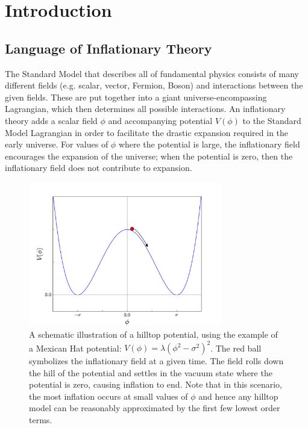 \documentclass[a4paper,11pt]{article}
\begin{document}
\newpage
{}
\small %

\section{Introduction}
\subsection{Language of Inflationary Theory}
\label{sec:GeneralDescription}
The Standard Model that describes all of fundamental physics consists of many different fields (e.g. scalar, vector, Fermion, Boson) and interactions between the given fields. These are put together into a giant universe-encompassing Lagrangian, which then determines all possible interactions. An inflationary theory adds a scalar field $\phi$ and accompanying potential $V(\phi)$ to the Standard Model Lagrangian in order to facilitate the drastic expansion required in the early universe. For values of $\phi$ where the potential is large, the inflationary field encourages the expansion of the universe; when the potential is zero, then the inflationary field does not contribute to expansion. 

\begin{figure}[H]
	\centering
	\includegraphics[width=0.75\textwidth]{figures/hilltop_cartoon.pdf}
	\caption[Schematic illustration of a Hilltop Model]{A schematic illustration of a hilltop potential, using the example of a Mexican Hat potential: $V(\phi)=\lambda(\phi^2-\sigma^2)^2$. The red ball symbolizes the inflationary field at a given time. The field rolls down the hill of the potential and settles in the vacuum state where the potential is zero, causing inflation to end. Note that in this scenario, the most inflation occurs at small values of $\phi$ and hence any hilltop model can be reasonably approximated by the first few lowest order terms.}
	\label{fig:MexHatCartoon}
\end{figure}
\end{document}
